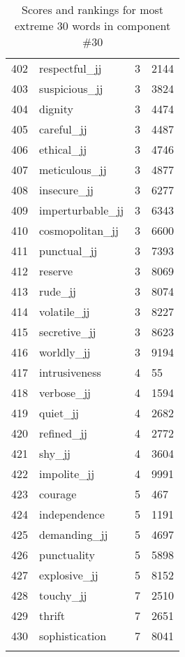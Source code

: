 \begin{longtable}[!htbp]{| rlr@{.}l |}
    402 & respectful\_jj & 3 & 2144 \\
    403 & suspicious\_jj & 3 & 3824 \\
    404 & dignity & 3 & 4474 \\
    405 & careful\_jj & 3 & 4487 \\
    406 & ethical\_jj & 3 & 4746 \\
    407 & meticulous\_jj & 3 & 4877 \\
    408 & insecure\_jj & 3 & 6277 \\
    409 & imperturbable\_jj & 3 & 6343 \\
    410 & cosmopolitan\_jj & 3 & 6600 \\
    411 & punctual\_jj & 3 & 7393 \\
    412 & reserve & 3 & 8069 \\
    413 & rude\_jj & 3 & 8074 \\
    414 & volatile\_jj & 3 & 8227 \\
    415 & secretive\_jj & 3 & 8623 \\
    416 & worldly\_jj & 3 & 9194 \\
    417 & intrusiveness & 4 & 55 \\
    418 & verbose\_jj & 4 & 1594 \\
    419 & quiet\_jj & 4 & 2682 \\
    420 & refined\_jj & 4 & 2772 \\
    421 & shy\_jj & 4 & 3604 \\
    422 & impolite\_jj & 4 & 9991 \\
    423 & courage & 5 & 467 \\
    424 & independence & 5 & 1191 \\
    425 & demanding\_jj & 5 & 4697 \\
    426 & punctuality & 5 & 5898 \\
    427 & explosive\_jj & 5 & 8152 \\
    428 & touchy\_jj & 7 & 2510 \\
    429 & thrift & 7 & 2651 \\
    430 & sophistication & 7 & 8041 \\
    \hline
    \caption{Scores and rankings for most extreme 30 words in component \#30} \\
\end{longtable}
